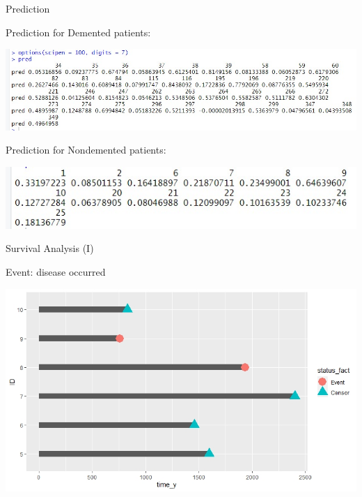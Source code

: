 \documentclass{beamer}
\begin{document}
	\begin{frame}{Prediction}
	
	Prediction for Demented patients:
	\begin{center}
		\includegraphics[width=\columnwidth]{prediction.jpeg}
	\end{center}

	Prediction for Nondemented patients:
	\begin{center}
		\includegraphics[width=0.8\columnwidth]{prediction2.jpeg}
	\end{center}	

		
	\end{frame}

	\begin{frame}{Survival Analysis (I)}
		
		\vspace{0.3 cm}
		Event: disease occurred
		
		\begin{center}
			\includegraphics[width=0.9\columnwidth]{survival_plot2.jpeg}
		\end{center}
	\end{frame}
\end{document}
